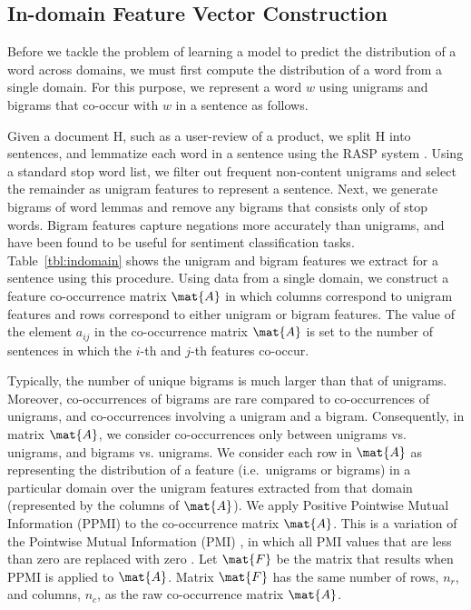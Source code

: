 \documentclass[11pt]{article}
\begin{document}
\subsection{In-domain Feature Vector Construction}
\label{sec:indomain}

Before we tackle the problem of learning a model to predict the distribution of a word across domains,
we must first compute the distribution of a word from a single domain. 
For this purpose, we represent a word $w$ using unigrams and bigrams that co-occur with $w$ in a sentence
as follows.

Given a document \textsf{H}, such as a user-review of a product, we split \textsf{H} into sentences, 
and lemmatize each word in a sentence using the RASP system \cite{RASP}.
Using a standard stop word list, we filter out frequent non-content unigrams and select
the remainder as unigram features to represent a sentence. 
Next, we generate bigrams of word lemmas and remove any bigrams that consists only of stop words.
Bigram features capture negations more accurately than unigrams, and have been found to be useful
for sentiment classification tasks.
Table~\ref{tbl:indomain} shows the unigram and bigram features we extract for a sentence using this procedure.
Using data from a single domain, we construct a feature co-occurrence matrix $\mat{A}$
in which columns correspond to unigram features and rows correspond to either unigram or bigram features. 
The value of the element $a_{ij}$ in the co-occurrence matrix $\mat{A}$
is set to the number of sentences in which the $i$-th and $j$-th features co-occur.

Typically, the number of unique bigrams is much larger than that of unigrams.
Moreover, co-occurrences of bigrams are rare compared to co-occurrences of unigrams,
and co-occurrences involving a unigram and a bigram.
Consequently, in matrix $\mat{A}$, we consider co-occurrences only between unigrams vs. unigrams, 
and bigrams vs. unigrams. We consider each row in $\mat{A}$ as representing the distribution of a
feature (i.e.\ unigrams or bigrams) in a particular domain over the unigram features extracted from that domain
(represented by the columns of $\mat{A}$). 
We apply Positive Pointwise Mutual Information (PPMI) to the co-occurrence
matrix $\mat{A}$. This is a variation of the Pointwise Mutual Information (PMI) \cite{Church:ACL:1990},
in which all PMI values that are less than zero are replaced with zero \cite{Lin:ACL:98,Bullinaria:2007}.
Let $\mat{F}$ be the matrix that results when PPMI is applied to $\mat{A}$.
Matrix  $\mat{F}$ has the same number of rows, $n_{r}$, and columns, $n_{c}$,
as the raw co-occurrence matrix $\mat{A}$.
\end{document}
